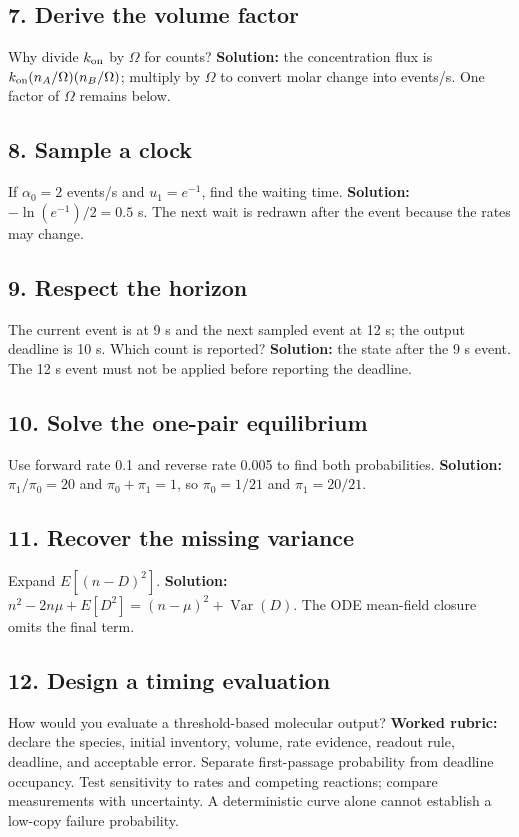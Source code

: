 \subsection*{7. Derive the volume factor}
Why divide $k_{\rm on}$ by $\Omega$ for counts?
\textbf{Solution:} the concentration flux is
$k_{\rm on}(n_A/\Omega)(n_B/\Omega)$; multiply by $\Omega$
to convert molar change into events/s. One factor of $\Omega$ remains below.

\subsection*{8. Sample a clock}
If $\alpha_0=2$ events/s and $u_1=e^{-1}$, find the waiting time.
\textbf{Solution:} $-\ln(e^{-1})/2=0.5$ s.
The next wait is redrawn after the event because the rates may change.

\subsection*{9. Respect the horizon}
The current event is at 9 s and the next sampled event at 12 s;
the output deadline is 10 s. Which count is reported?
\textbf{Solution:} the state after the 9 s event. The 12 s event must
not be applied before reporting the deadline.

\subsection*{10. Solve the one-pair equilibrium}
Use forward rate 0.1 and reverse rate 0.005 to find both probabilities.
\textbf{Solution:} $\pi_1/\pi_0=20$ and $\pi_0+\pi_1=1$,
so $\pi_0=1/21$ and $\pi_1=20/21$.

\subsection*{11. Recover the missing variance}
Expand $E[(n-D)^2]$.
\textbf{Solution:} $n^2-2n\mu+E[D^2]=(n-\mu)^2+\operatorname{Var}(D)$.
The ODE mean-field closure omits the final term.

\subsection*{12. Design a timing evaluation}
How would you evaluate a threshold-based molecular output?
\textbf{Worked rubric:} declare the species, initial inventory, volume,
rate evidence, readout rule, deadline, and acceptable error. Separate
first-passage probability from deadline occupancy. Test sensitivity to
rates and competing reactions; compare measurements with uncertainty.
A deterministic curve alone cannot establish a low-copy failure probability.
